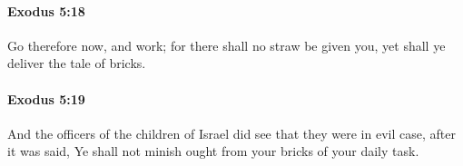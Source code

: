 		\paragraph{Exodus 5:18} %
			\label{EXODUS-5-18}

			Go therefore now, and work; for there shall no straw be given you, yet shall ye deliver the tale of bricks.


		\paragraph{Exodus 5:19} %
			\label{EXODUS-5-19}

			And the officers of the children of Israel did see that they were in evil case, after it was said, Ye shall not minish ought from your bricks of your daily task.


